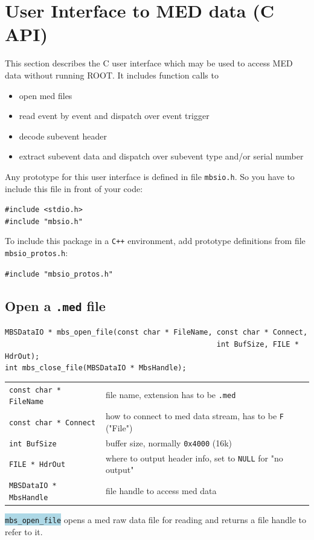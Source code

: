 \documentclass[10pt]{article}
\newcommand{\blue}[1]{\colorbox{lightblue}{\texttt{#1}}}
\newenvironment{blueboxed}
	{\begin{Sbox}\begin{minipage}[t]}
	{\end{minipage}\end{Sbox}\colorbox{lightblue}{\TheSbox}}
\begin{document}
\section{User Interface to MED data (C API)}
This section describes the C user interface which may be used to access MED data without running ROOT.
It includes function calls to
\begin{itemize}
	\item	open med files
	\item	read event by event and dispatch over event trigger
	\item	decode subevent header
	\item	extract subevent data and dispatch over subevent type and/or serial number
\end{itemize}
Any prototype for this user interface is defined in file \verb+mbsio.h+.
So you have to include this file in front of your code:
\begin{center}
\begin{blueboxed}{.3\linewidth}
	\verb+#include <stdio.h>+\\
	\verb+#include "mbsio.h"+
\end{blueboxed}
\end{center}
To include this package in a \texttt{C++} environment, add prototype definitions from file \verb+mbsio_protos.h+:\hfill
\begin{center}
\begin{blueboxed}{.3\linewidth}
	\verb+#include "mbsio_protos.h"+
\end{blueboxed}
\end{center}\vspace{5mm}
\subsection{Open a \texttt{.med} file}\vspace{3mm}
\begin{blueboxed}{\linewidth}
	\verb+MBSDataIO * mbs_open_file(const char * FileName, const char * Connect,+\\
	\verb+                                                 int BufSize, FILE * HdrOut);+\\
	\verb+int mbs_close_file(MBSDataIO * MbsHandle);+
\end{blueboxed}
\begin{center}
\begin{tabular}{ll}
\verb+const char * FileName+	& file name, extension has to be \verb+.med+\\
\verb+const char * Connect+	& how to connect to med data stream, has to be \verb+F+ ("File")\\
\verb+int BufSize+		& buffer size, normally \verb+0x4000+ (16k)\\
\verb+FILE * HdrOut+		& where to output header info, set to \verb+NULL+ for "no output"\\
\verb+MBSDataIO * MbsHandle+	& file handle to access med data\\
\end{tabular}
\end{center}
\blue{mbs\_open\_file} opens a med raw data file for reading and returns a file handle to refer to it.
\end{document}
